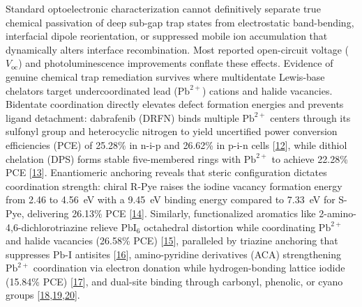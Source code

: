 \documentclass[
  11pt,
]{article}
\begin{document}
Standard optoelectronic characterization cannot definitively separate
true chemical passivation of deep sub-gap trap states from electrostatic
band-bending, interfacial dipole reorientation, or suppressed mobile ion
accumulation that dynamically alters interface recombination. Most
reported open-circuit voltage (\(V_{\mathrm{oc}}\)) and
photoluminescence improvements conflate these effects. Evidence of
genuine chemical trap remediation survives where multidentate Lewis-base
chelators target undercoordinated lead (\(\mathrm{Pb}^{2+}\)) cations
and halide vacancies. Bidentate coordination directly elevates defect
formation energies and prevents ligand detachment: dabrafenib (DRFN)
binds multiple \(\mathrm{Pb}^{2+}\) centers through its sulfonyl group
and heterocyclic nitrogen to yield uncertified power conversion
efficiencies (PCE) of 25.28\% in n-i-p and 26.62\% in p-i-n cells
{[}\href{https://doi.org/10.1002/adfm.76623}{12}{]}, while dithiol
chelation (DPS) forms stable five-membered rings with
\(\mathrm{Pb}^{2+}\) to achieve 22.28\% PCE
{[}\href{https://doi.org/10.1002/adma.73833}{13}{]}. Enantiomeric
anchoring reveals that steric configuration dictates coordination
strength: chiral R-Pye raises the iodine vacancy formation energy from
2.46 to \qty{4.56}{\electronvolt} with a \qty{9.45}{\electronvolt}
binding energy compared to \qty{7.33}{\electronvolt} for S-Pye,
delivering 26.13\% PCE
{[}\href{https://doi.org/10.1002/aenm.71222}{14}{]}. Similarly,
functionalized aromatics like 2-amino-4,6-dichlorotriazine relieve
\(\mathrm{PbI}_6\) octahedral distortion while coordinating
\(\mathrm{Pb}^{2+}\) and halide vacancies (26.58\% PCE)
{[}\href{https://doi.org/10.1021/acsmaterialslett.5c01678}{15}{]},
paralleled by triazine anchoring that suppresses
\(\mathrm{Pb}\)-\(\mathrm{I}\) antisites
{[}\href{https://doi.org/10.1002/adfm.76218}{16}{]}, amino-pyridine
derivatives (ACA) strengthening \(\mathrm{Pb}^{2+}\) coordination via
electron donation while hydrogen-bonding lattice iodide (15.84\% PCE)
{[}\href{https://doi.org/10.1021/acs.jpclett.6c01600}{17}{]}, and
dual-site binding through carbonyl, phenolic, or cyano groups
{[}\href{https://doi.org/10.1021/acsami.6c04650}{18},\href{https://doi.org/10.1002/smll.74320}{19},\href{https://doi.org/10.1021/acs.jpclett.6c01458}{20}{]}.
\end{document}
